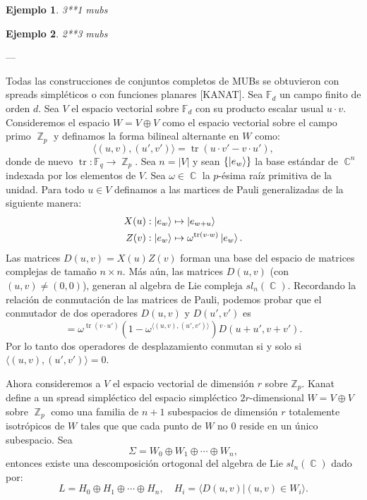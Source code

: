 \documentclass[a4paper]{report}
\DeclareMathOperator{\C}{\mathbb{C}}
\DeclareMathOperator{\Z}{\mathbb{Z}}
\DeclareMathOperator{\tr}{tr}
\newtheorem{example}{Ejemplo}
\begin{document}
  \begin{example}
    3**1 mubs
  \end{example}

  \begin{example}
    2**3 mubs
  \end{example}
  
  ---

  Todas las construcciones de conjuntos completos de MUBs se
  obtuvieron con spreads simpléticos o con funciones
  planares [KANAT]. Sea  $\mathbb F_d$ un campo finito de
  orden $d$. Sea $V$ el espacio vectorial sobre $\mathbb
  F_d$ con su producto escalar usual $u \cdot v$.
  Consideremos el espacio $W = V \oplus V$ como el espacio
  vectorial sobre el campo primo $\Z_p$ y definamos
  la forma bilineal alternante en $W$ como:
  \begin{equation}
    \langle (u,v), (u',v') \rangle
    = \tr\left( u \cdot v' - v \cdot u' \right),
  \end{equation}
  donde de nuevo $\tr : \mathbb F_q \to \Z_p$. Sea $n = |V|$ 
  y sean $\{\ket{e_w}\}$ la base estándar de $\C^{n}$ 
  indexada por los elementos de $V$. Sea $\omega \in \C$ la
  $p$-ésima raíz primitiva de la unidad. Para todo $u \in V$ 
  definamos a las martices de Pauli generalizadas de la
  siguiente manera:
  \begin{align}
    X(u) &: \ket{e_w} \mapsto \ket{e_{w+u}} \\
    Z(v) &: \ket{e_w} \mapsto \omega^{\tr(v \cdot w)}
    \ket{e_w}.
  \end{align}
  Las matrices $D(u,v) = X(u)Z(v)$ forman una base del
  espacio de matrices complejas de tamaño $n \times n$. Más
  aún, las matrices $D(u,v)$ (con $(u,v) \neq (0,0)$),
  generan al algebra de Lie compleja $sl_n(\C)$. Recordando
  la relación de conmutación de las matrices de Pauli,
  podemos probar que el conmutador de dos operadores
  $D(u,v)$ y $D(u',v')$ es
  \begin{equation}
    [D(u,v), D(u',v')]
    = \omega^{\tr(v \cdot u')}
    \left( 1 - \omega^{\langle (u,v), (u',v') \rangle}
    \right) D(u+u',v+v').
  \end{equation}
  Por lo tanto dos operadores de desplazamiento conmutan si
  y solo si $\langle (u,v), (u',v') \rangle = 0$.

  Ahora consideremos a $V$ el espacio vectorial de dimensión
  $r$ sobre $\mathbb Z_p$. Kanat define a un spread
  simpléctico del espacio simpléctico $2r$-dimensional $W =
  V \oplus V$ sobre $\Z_p$ como una familia de $n+1$ 
  subespacios de dimensión $r$ totalemente isotrópicos de
  $W$ tales que que cada punto de $W$ no 0 reside en un
  único subespacio. Sea
  \[
    \Sigma = W_0 \oplus W_1 \oplus \cdots \oplus W_n,
  \] 
  entonces existe una descomposición ortogonal  del algebra
  de Lie $sl_n(\C)$ dado por:
  \begin{equation}
    L = H_0 \oplus H_1 \oplus \cdots \oplus H_n,
    \quad
    H_i = \langle D(u,v) | (u,v) \in W_i \rangle.
  \end{equation}
\end{document}
